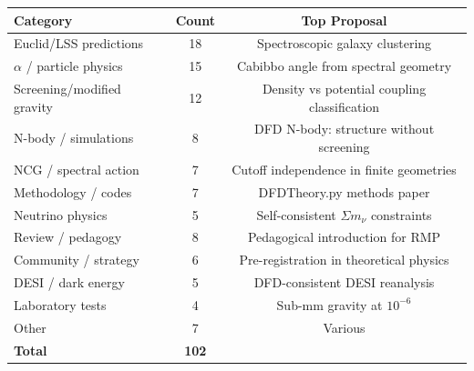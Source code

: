 \documentclass[11pt,a4paper]{article}
\begin{document}
\begin{center}
\begin{tabular}{lcc}
\toprule
\textbf{Category} & \textbf{Count} & \textbf{Top Proposal} \\
\midrule
Euclid/LSS predictions & 18 & Spectroscopic galaxy clustering \\
$\alpha$ / particle physics & 15 & Cabibbo angle from spectral geometry \\
Screening/modified gravity & 12 & Density vs potential coupling classification \\
N-body / simulations & 8 & DFD N-body: structure without screening \\
NCG / spectral action & 7 & Cutoff independence in finite geometries \\
Methodology / codes & 7 & DFDTheory.py methods paper \\
Neutrino physics & 5 & Self-consistent $\Sigma m_\nu$ constraints \\
Review / pedagogy & 8 & Pedagogical introduction for RMP \\
Community / strategy & 6 & Pre-registration in theoretical physics \\
DESI / dark energy & 5 & DFD-consistent DESI reanalysis \\
Laboratory tests & 4 & Sub-mm gravity at $10^{-6}$ \\
Other & 7 & Various \\
\midrule
\textbf{Total} & \textbf{102} & \\
\bottomrule
\end{tabular}
\end{center}
\end{document}
